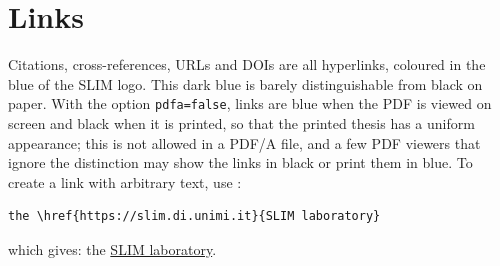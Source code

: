 \section{Links} \label{sec:links}

Citations, cross-references, URLs and DOIs are all hyperlinks, coloured in
the blue of the SLIM logo. This dark blue is barely distinguishable from
black on paper. With the option \texttt{pdfa=false}, links are blue when the
PDF is viewed on screen and black when it is printed, so that the printed
thesis has a uniform appearance; this is not allowed in a PDF/A file, and a
few PDF viewers that ignore the distinction may show the links in black or
print them in blue. To create a link with arbitrary text, use :
\begin{Verbatim}
the \href{https://slim.di.unimi.it}{SLIM laboratory}
\end{Verbatim}
which gives: the \href{https://slim.di.unimi.it}{SLIM laboratory}.
